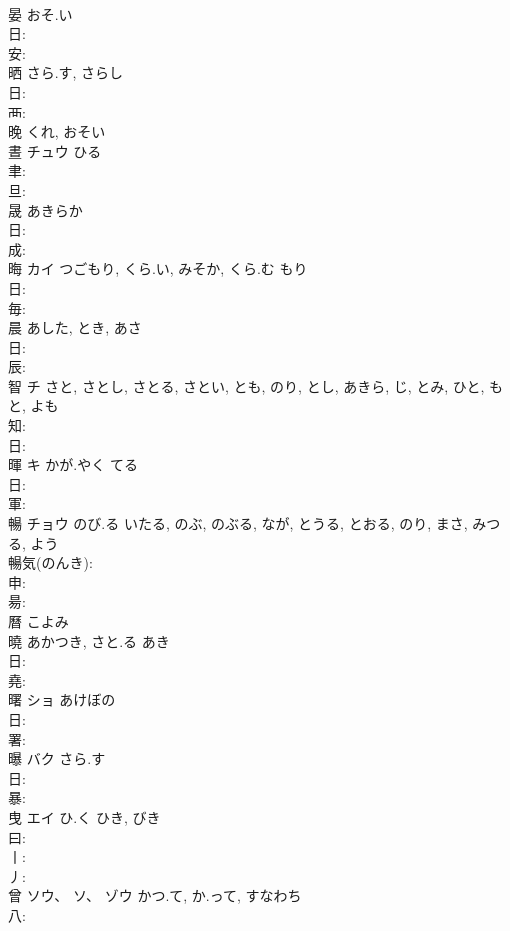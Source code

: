 \documentclass[8pt]{extreport}
\begin{document}
\begin{CJK}{UTF8}{min}
\\	晏		おそ.い			
\\	日: 
\\	安: 
\\	晒		さら.す, さらし			
\\	日: 
\\	襾: 
\\	晚		くれ, おそい				
\\	晝	チュウ	ひる				
\\	聿: 
\\	旦: 
\\	晟		あきらか			
\\	日: 
\\	成: 
\\	晦	カイ	つごもり, くら.い, みそか, くら.む	もり	
\\	日: 
\\	毎: 
\\	晨		あした, とき, あさ			
\\	日: 
\\	辰: 
\\	智	チ		さと, さとし, さとる, さとい, とも, のり, とし, あきら, じ, とみ, ひと, もと, よも	
\\	知: 
\\	日: 
\\	暉	キ	かが.やく	てる	
\\	日: 
\\	軍: 
\\	暢	チョウ	のび.る	いたる, のぶ, のぶる, なが, とうる, とおる, のり, まさ, みつる, よう	
\\	暢気(のんき): 
\\	申: 
\\	昜: 
\\	曆		こよみ				
\\	曉		あかつき, さと.る	あき			
\\	日: 
\\	堯: 
\\	曙	ショ	あけぼの		
\\	日: 
\\	署: 
\\	曝	バク	さら.す		
\\	日: 
\\	暴: 
\\	曳	エイ	ひ.く	ひき, びき	
\\	曰: 
\\	丨: 
\\	丿: 
\\	曾	ソウ、 ソ、 ゾウ	かつ.て, か.って, すなわち		
\\	八: 

\end{CJK}
\end{document}
